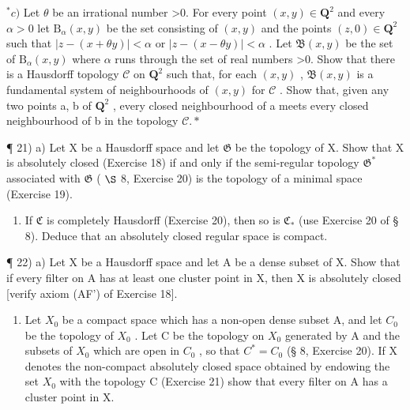 \(^{*}c)\) Let \(\theta\) be an irrational number \textgreater0. For every point \((x,y)\in\mathbf{Q}^{2}\) and every \(\alpha>0\) let \(\mathrm{B}_{\alpha}(x,y)\) be the set consisting of \((x,y)\) and the points \((z,0)\in\mathbf{Q}^{2}\) such that \(|z-(x+\theta y)|<\alpha\) or \(|z-(x-\theta y)|<\alpha\) . Let \(\mathfrak{B}(x,y)\) be the set of \(\mathrm{B}_{\alpha}(x,y)\) where \(\alpha\) runs through the set of real numbers \textgreater0. Show that there is a Hausdorff topology \(\mathcal{C}\) on \(\mathbf{Q}^{2}\) such that, for each \((x,y)\) , \(\mathfrak{B}(x,y)\) is a fundamental system of neighbourhoods of \((x,y)\) for \(\mathcal{C}\) . Show that, given any two points a, b of \(\mathbf{Q}^{2}\) , every closed neighbourhood of a meets every closed neighbourhood of b in the topology \(\mathcal{C}.*\)

¶ 21) a) Let X be a Hausdorff space and let \(\mathfrak{G}\) be the topology of X. Show that X is absolutely closed (Exercise 18) if and only if the semi-regular topology \(\mathfrak{G}^*\) associated with \(\mathfrak{G}\) ( \(\S\) 8, Exercise 20) is the topology of a minimal space (Exercise 19).

\begin{enumerate}
\def\labelenumi{\alph{enumi})}
\setcounter{enumi}{1}
\tightlist
\item
  If \(\mathfrak{C}\) is completely Hausdorff (Exercise 20), then so is \(\mathfrak{C}_{*}\) (use Exercise 20 of § 8). Deduce that an absolutely closed regular space is compact.
\end{enumerate}

¶ 22) a) Let X be a Hausdorff space and let A be a dense subset of X. Show that if every filter on A has at least one cluster point in X, then X is absolutely closed {[}verify axiom (AF') of Exercise 18{]}.

\begin{enumerate}
\def\labelenumi{\alph{enumi})}
\setcounter{enumi}{1}
\tightlist
\item
  Let \(X_{0}\) be a compact space which has a non-open dense subset A, and let \(C_{0}\) be the topology of \(X_{0}\) . Let C be the topology on \(X_{0}\) generated by A and the subsets of \(X_{0}\) which are open in \(C_{0}\) , so that \(C^{*} = C_{0}\) (§ 8, Exercise 20). If X denotes the non-compact absolutely closed space obtained by endowing the set \(X_{0}\) with the topology C (Exercise 21) show that every filter on A has a cluster point in X.
\end{enumerate}

